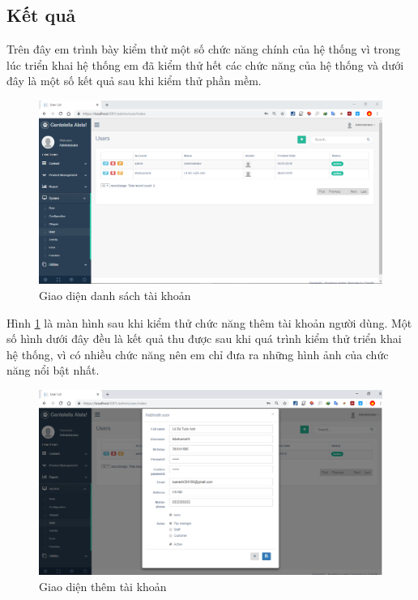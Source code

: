 \subsection{Kết quả}
Trên đây em trình bày kiểm thử một số chức năng chính của hệ thống vì trong lúc triển khai hệ thống em đã kiểm thử hết các chức năng của hệ thống và dưới đây là một số kết quả sau khi kiểm thử phần mềm.
 \begin{center}
    \begin{figure}[h]
    \begin{center}
     \includegraphics[scale=0.45]{image/danhsachTK}
    \end{center}
    \caption{Giao diện danh sách tài khoản}
    \label{refhinh4_2}
    \end{figure}
\end{center}
\par
Hình \ref{refhinh4_2} là màn hình sau khi kiểm thử chức năng thêm tài khoản người dùng. Một số hình dưới đây đều là kết quả thu được sau khi quá trình kiểm thử triển khai hệ thống, vì có nhiều chức năng nên em chỉ đưa ra những hình ảnh của chức năng nổi bật nhất.
 \begin{center}
    \begin{figure}[h]
    \begin{center}
     \includegraphics[scale=0.45]{image/themTK}
    \end{center}
    \caption{Giao diện thêm tài khoản}
    \label{refhinh4_3}
    \end{figure}
\end{center}

